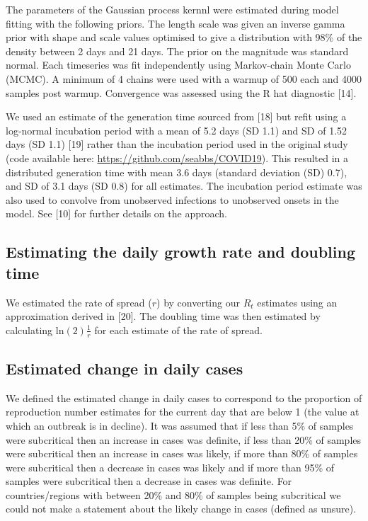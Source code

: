 \documentclass[
]{article}
\begin{document}
The parameters of the Gaussian process kernnl were estimated during
model fitting with the following priors. The length scale was given an
inverse gamma prior with shape and scale values optimised to give a
distribution with 98\% of the density between 2 days and 21 days. The
prior on the magnitude was standard normal. Each timeseries was fit
independently using Markov-chain Monte Carlo (MCMC). A minimum of 4
chains were used with a warmup of 500 each and 4000 samples post warmup.
Convergence was assessed using the R hat diagnostic {[}14{]}.

We used an estimate of the generation time sourced from {[}18{]} but
refit using a log-normal incubation period with a mean of 5.2 days (SD
1.1) and SD of 1.52 days (SD 1.1) {[}19{]} rather than the incubation
period used in the original study (code available here:
\url{https://github.com/seabbs/COVID19}). This resulted in a distributed
generation time with mean 3.6 days (standard deviation (SD) 0.7), and SD
of 3.1 days (SD 0.8) for all estimates. The incubation period estimate
was also used to convolve from unobserved infections to unobserved
onsets in the model. See {[}10{]} for further details on the approach.

\hypertarget{estimating-the-daily-growth-rate-and-doubling-time}{%
\subsection{Estimating the daily growth rate and doubling
time}\label{estimating-the-daily-growth-rate-and-doubling-time}}

We estimated the rate of spread (\(r\)) by converting our \(R_t\)
estimates using an approximation derived in {[}20{]}. The doubling time
was then estimated by calculating \(\text{ln}(2) \frac{1}{r}\) for each
estimate of the rate of spread.

\hypertarget{estimated-change-in-daily-cases}{%
\subsection{Estimated change in daily
cases}\label{estimated-change-in-daily-cases}}

We defined the estimated change in daily cases to correspond to the
proportion of reproduction number estimates for the current day that are
below 1 (the value at which an outbreak is in decline). It was assumed
that if less than 5\% of samples were subcritical then an increase in
cases was definite, if less than 20\% of samples were subcritical then
an increase in cases was likely, if more than 80\% of samples were
subcritical then a decrease in cases was likely and if more than 95\% of
samples were subcritical then a decrease in cases was definite. For
countries/regions with between 20\% and 80\% of samples being
subcritical we could not make a statement about the likely change in
cases (defined as unsure).
\end{document}
